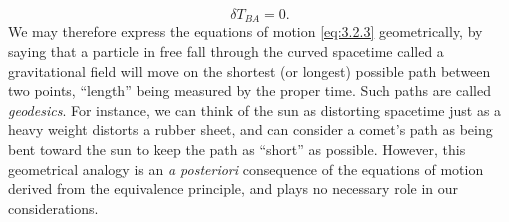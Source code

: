 \[
  \delta T_{BA}=0.
\]
We may therefore express the equations of motion \eqref{eq:3.2.3}
geometrically, by saying that a particle in free fall through the curved
spacetime called a gravitational field will move on the shortest (or
longest) possible path between two points, ``length'' being measured by the
proper time. Such paths are called \emph{geodesics}. For instance, we can
think of the sun as distorting spacetime just as a heavy weight distorts a
rubber sheet, and can consider a comet's path as being bent toward the sun to
keep the path as ``short'' as possible. However, this geometrical analogy is
an \emph{a posteriori} consequence of the equations of motion derived from
the equivalence principle, and plays no necessary role in our
considerations.
